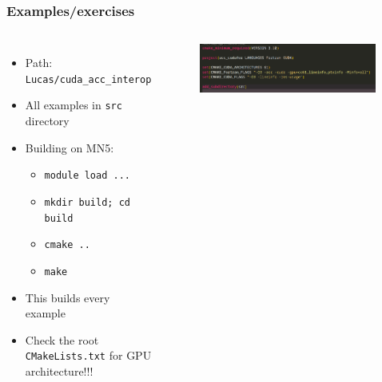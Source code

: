 \begin{frame}
	\frametitle{Examples/exercises}
	\begin{columns}
		\begin{itemize}
			\item Path: \texttt{Lucas/cuda\_acc\_interop}
			\item All examples in \texttt{src} directory
			\item Building on MN5:
			\begin{itemize}
				\item \texttt{module load ...}
				\item \texttt{mkdir build; cd build}
				\item \texttt{cmake ..}
				\item \texttt{make}
			\end{itemize}
			\item This builds every example
			\item Check the root \texttt{CMakeLists.txt} for GPU architecture!!!
		\end{itemize}
		\begin{figure}
			\centering
			\includegraphics[width=0.99\textwidth]{images/cmakelists_1.png}
		\end{figure}
	\end{columns}
\end{frame}

